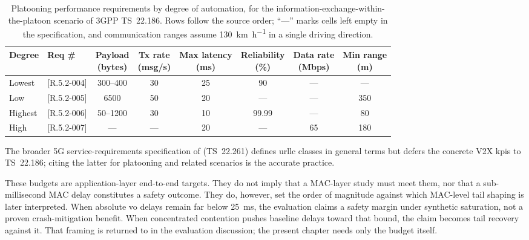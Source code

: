 \begin{table}[htb]
	\ABNTEXfontereduzida
	\caption{\label{tab:bg:platooning-kpis}Platooning performance requirements by degree of automation, for the information-exchange-within-the-platoon scenario of 3GPP TS~22.186. Rows follow the source order; ``---'' marks cells left empty in the specification, and communication ranges assume \SI{130}{\km\per\hour} in a single driving direction.}
	\begin{center}
		\setlength{\tabcolsep}{4pt}
		\begin{tabular}{@{}llcccccc@{}}
			\toprule
			Degree & Req \# & \shortstack{Payload\\(bytes)} & \shortstack{Tx rate\\(msg/s)} & \shortstack{Max latency\\(ms)} & \shortstack{Reliability\\(\%)} & \shortstack{Data rate\\(Mbps)} & \shortstack{Min range\\(m)} \\
			\midrule
			Lowest & [R.5.2-004] & 300--400 & 30 & 25 & 90 & --- & --- \\
			Low & [R.5.2-005] & 6500 & 50 & 20 & --- & --- & 350 \\
			Highest & [R.5.2-006] & 50--1200 & 30 & 10 & 99.99 & --- & 80 \\
			High & [R.5.2-007] & --- & --- & 20 & --- & 65 & 180 \\
			\bottomrule
		\end{tabular}
	\end{center}
\end{table}

The broader 5G service-requirements specification of \textcite{3gpp_ts_22_261_r18} (TS~22.261) defines \gls{urllc} classes in general terms but defers the concrete V2X \glspl{kpi} to TS~22.186; citing the latter for platooning and related scenarios is the accurate practice.

These budgets are application-layer end-to-end targets.
They do not imply that a MAC-layer study must meet them, nor that a sub-millisecond MAC delay constitutes a safety outcome.
They do, however, set the order of magnitude against which MAC-level tail shaping is later interpreted.
When absolute \gls{vo} delays remain far below \SI{25}{\milli\second}, the evaluation claims a safety margin under synthetic saturation, not a proven crash-mitigation benefit.
When concentrated contention pushes baseline delays toward that bound, the claim becomes tail recovery against it.
That framing is returned to in the evaluation discussion; the present chapter needs only the budget itself.

